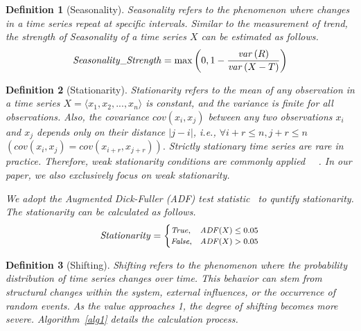 \documentclass[sigconf, nonacm, pdfa]{acmart}
\newtheorem{definition}{Definition}
\begin{document}
\begin{definition}[Seasonality]
Seasonality refers to the phenomenon where changes in a time series repeat at specific intervals. Similar to the measurement of trend, the strength of Seasonality of a time series $X$ can be estimated as follows.
\begin{equation}
\footnotesize
\mathit{Seasonality\_Strength}=\max \left(0, 1-\frac{\mathit{var}\left(R\right)}{\mathit{var}\left(X-T\right)}\right)
\end{equation}
\end{definition}



\begin{definition}[Stationarity]
Stationarity refers to the mean of any observation in a time series $X=\langle x_1,x_2,...,x_n\rangle$ is constant, and the variance is finite for all observations. Also, the covariance $\mathit{cov}(x_i,x_j)$ between any two observations $x_i$ and $x_j$ depends only on their distance $|j-i|$, i.e., $\forall i+r\leq n,j+r\leq n$ $(\mathit{cov}(x_i,x_j)=\mathit{cov}(x_{i+r},x_{j+r})).$ Strictly stationary time series are rare in practice. Therefore, weak stationarity conditions are commonly applied~\cite{lee2017anomaly} ~\cite{nason2006stationary}. In our paper, we also exclusively focus on weak stationarity.


We adopt the Augmented Dick-Fuller (ADF) test statistic~\cite{elliott1992efficient} to quntify stationarity. The stationarity can be calculated as follows.
\begin{equation}
\footnotesize
\mathit{Stationarity}=\begin{cases}\mathit{True} , &\mathit{ADF}(X)\leq0.05\\\mathit{False} ,&\mathit{ADF}(X)>0.05\end{cases}
\end{equation}
\end{definition}

\begin{definition}[Shifting]
Shifting refers to the phenomenon where the probability distribution of time series changes over time. This behavior can stem from structural changes within the system, external influences, or the occurrence of random events. As the value approaches 1, the degree of shifting becomes more severe. Algorithm~\ref{alg1} details the calculation process.


\end{definition}
\end{document}
